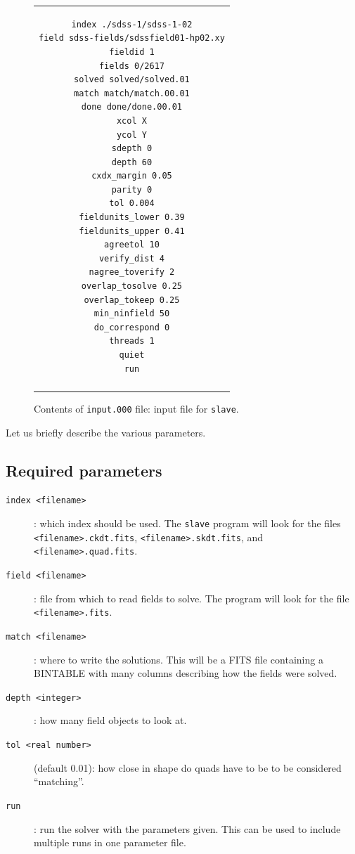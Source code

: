 \documentclass[12pt,letterpaper,titlepage]{article}
\newcommand{\code}[1]{\texttt{#1}}
\begin{document}
\begin{figure}[h!]
\begin{center}
\begin{tabular}{|@{\hspace{24pt}}c@{\hspace{24pt}}|}
\hline
\begin{minipage}{0.6\textwidth}
\vspace{10pt}
\begin{verbatim}
index ./sdss-1/sdss-1-02
field sdss-fields/sdssfield01-hp02.xy
fieldid 1
fields 0/2617
solved solved/solved.01
match match/match.00.01
done done/done.00.01
xcol X
ycol Y
sdepth 0
depth 60
cxdx_margin 0.05
parity 0
tol 0.004
fieldunits_lower 0.39
fieldunits_upper 0.41
agreetol 10
verify_dist 4
nagree_toverify 2
overlap_tosolve 0.25
overlap_tokeep 0.25
min_ninfield 50
do_correspond 0
threads 1
quiet
run
\end{verbatim}
\end{minipage}%
\\
\rule{0pt}{4pt} \\
\hline
\end{tabular}
\end{center}
\caption{Contents of \code{input.000} file: input file for \code{slave}.}
\label{input000}
\end{figure}

Let us briefly describe the various parameters.

\subsection{Required parameters}
\begin{description}
\item[\code{index <filename>}]: which index should be used.  The
  \code{slave} program will look for the files \code{<filename>.ckdt.fits},
  \code{<filename>.skdt.fits}, and \code{<filename>.quad.fits}.
\item[\code{field <filename>}]: file from which to read fields to solve.
  The program will look for the file \code{<filename>.fits}.
\item[\code{match <filename>}]: where to write the solutions.  This will be
  a FITS file containing a BINTABLE with many columns describing how the
  fields were solved.
\item[\code{depth <integer>}]: how many field objects to look at.
\item[\code{tol <real number>}] (default 0.01): how close in shape do quads
  have to be to be considered ``matching''.
\item[\code{run}]: run the solver with the parameters given.  This can be
  used to include multiple runs in one parameter file.
\end{description}
\end{document}
